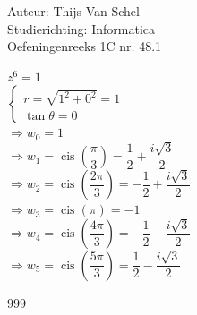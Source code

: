 \documentclass[a4paper]{article}
\newcommand{\cis}{\operatorname{cis}}
\begin{document}
  
\noindent \large Auteur: Thijs Van Schel \\
\noindent \large Studierichting: Informatica\\
\noindent \large Oefeningenreeks 1C nr. 48.1\\

\medskip

\normalsize

$z^6 = 1$ \\

$\left\{
\begin{array}{l}
r = \sqrt{1^2+0^2} = 1 \\
\tan\theta = 0
\end{array}
\right.$ \\

$\Rightarrow w_0 = 1$ \\

$\Rightarrow w_1 = \cis\left(\dfrac{\pi}{3}\right) = \dfrac{1}{2} + \dfrac{i\sqrt{3}}{2}$ \\

$\Rightarrow w_2 = \cis\left(\dfrac{2\pi}{3}\right) = -\dfrac{1}{2} + \dfrac{i\sqrt{3}}{2}$ \\

$\Rightarrow w_3 = \cis\left(\pi\right) = -1$ \\

$\Rightarrow w_4 = \cis\left(\dfrac{4\pi}{3}\right) = -\dfrac{1}{2} - \dfrac{i\sqrt{3}}{2}$ \\

$\Rightarrow w_5 = \cis\left(\dfrac{5\pi}{3}\right) = \dfrac{1}{2} - \dfrac{i\sqrt{3}}{2}$

\begin{thebibliography}{999}
\end{thebibliography}
\end{document}
